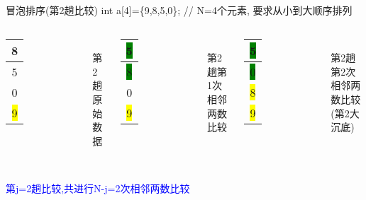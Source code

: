 \begin{frame}{冒泡排序(第2趟比较)}
int a[4]=\{9,8,5,0\}; // N=4个元素, 要求从小到大顺序排列
\begin{columns}[T]
	\begin{tabular}{|c|}
		\hline 
		8 \\ 
		\hline 
		5 \\ 
		\hline 
		0 \\ 
		\hline
		\colorbox{yellow}{9} \\
		\hline 
	\end{tabular}\\ 
	第2趟原始数据
	\pause
	\begin{tabular}{|c|}
		\hline 
		\colorbox{green}{5} \\ 
		\hline 
		\colorbox{green}{8} \\ 
		\hline 
		0 \\ 
		\hline
		\colorbox{yellow}{9} \\
		\hline  
	\end{tabular}\\ 
	第2趟第1次相邻两数比较
	\pause
	\begin{tabular}{|c|}
		\hline 
		\colorbox{green}{5} \\ 
		\hline 
		\colorbox{green}{0} \\ 
		\hline 
		\colorbox{yellow}{8} \\ 
		\hline 
		\colorbox{yellow}{9} \\
		\hline 
	\end{tabular}\\ 
	第2趟第2次相邻两数比较(第2大沉底)
\end{columns}
~\\
\textcolor{blue}{第j=2趟比较,共进行N-j=2次相邻两数比较}
\end{frame}


